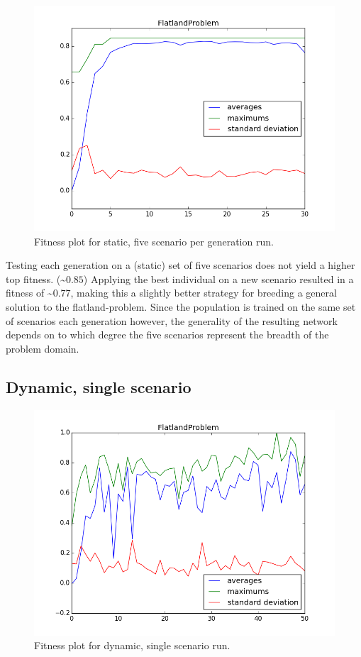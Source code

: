 \documentclass[twoside]{article}
\begin{document}
\begin{multicols}{2}
  \begin{figure}[H]
    \centering
    \includegraphics[width=\linewidth]{images/static_5.png}
    \caption{Fitness plot for static, five scenario per generation run.} \label{fig:static-single}
  \end{figure}

  Testing each generation on a (static) set of five scenarios does not yield a higher top fitness. (\textasciitilde $0.85$)
  Applying the best individual on a new scenario resulted in a fitness of \textasciitilde $0.77$, making this a slightly better strategy for breeding a general solution to the flatland-problem.
  Since the population is trained on the same set of scenarios each generation however, the generality of the resulting network depends on to which degree the five scenarios represent the breadth of the problem domain.

  \subsection{Dynamic, single scenario}
  
  \begin{figure}[H]
    \centering
    \includegraphics[width=\linewidth]{images/dynamic_1.png}
    \caption{Fitness plot for dynamic, single scenario run.} \label{fig:static-single}
  \end{figure}


\end{multicols}
\end{document}
